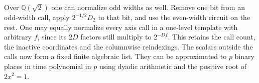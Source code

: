 Over \(\mathbb Q(\sqrt2)\) one can normalize odd widths as well.
Remove one bit from an odd-width call, apply \(2^{-1/2}D_2\) to that
bit, and use the even-width circuit on the rest. One may equally
normalize every axis call in a one-level template with arbitrary \(f\),
since its \(2D\) factors still multiply to \(2^{-Df}\). This retains
the call count, the inactive coordinates and the columnwise
reindexings. The scalars outside the calls now form a fixed finite
algebraic list. They can be approximated to \(p\) binary places in
time polynomial in \(p\) using dyadic arithmetic and the positive
root of \(2x^2=1\).
